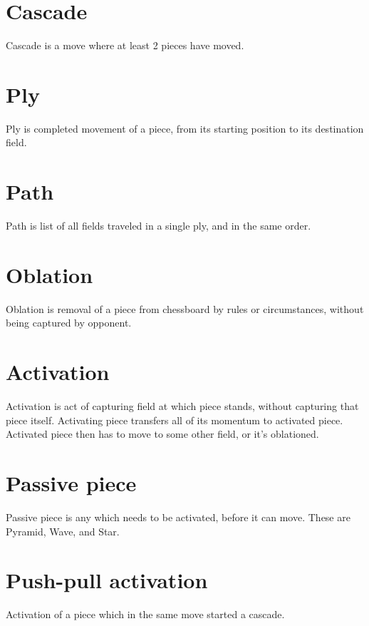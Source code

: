 \section*{Cascade}
\label{sec:Terms/Cascade}
Cascade is a move where at least 2 pieces have moved.

\section*{Ply}
\label{sec:Terms/Ply}
Ply is completed movement of a piece, from its starting position to its destination
field.

\section*{Path}
\label{sec:Terms/Path}
Path is list of all fields traveled in a single ply, and in the same order.

\section*{Oblation}
\label{sec:Terms/Oblation}
Oblation is removal of a piece from chessboard by rules or circumstances,
without being captured by opponent.

\section*{Activation}
\label{sec:Terms/Activation}
Activation is act of capturing field at which piece stands, without capturing that
piece itself. Activating piece transfers all of its momentum to activated piece.
Activated piece then has to move to some other field, or it's oblationed.

\section*{Passive piece}
\label{sec:Terms/Passive piece}
Passive piece is any which needs to be activated, before it can move.
These are Pyramid, Wave, and Star.

\section*{Push-pull activation}
\label{sec:Terms/Push-pull activation}
Activation of a piece which in the same move started a cascade.

